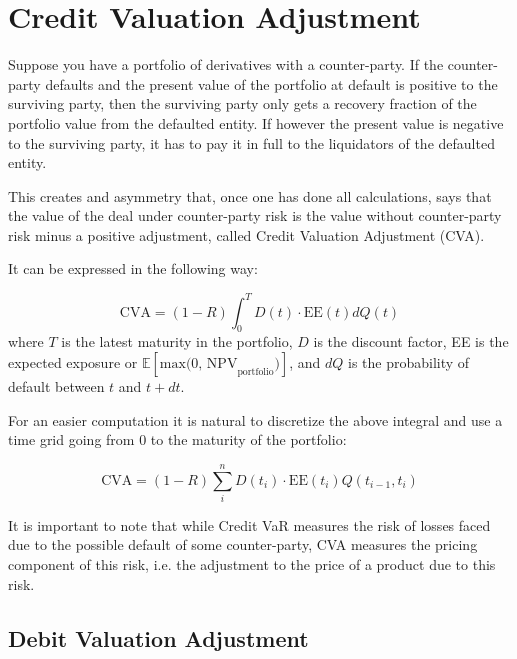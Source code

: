\section{Credit Valuation
Adjustment}\label{credit-valuation-adjustment}

Suppose you have a portfolio of derivatives with a counter-party. 
If the counter-party defaults and the present value of the portfolio at
default is positive to the surviving party, then the surviving party only
gets a recovery fraction of the portfolio value from the defaulted entity. 
If however the present value is negative to the surviving party,
it has to pay it in full to the liquidators of the defaulted entity.

This creates and asymmetry that, once one has done all
calculations, says that the value of the deal under counter-party risk is
the value without counter-party risk minus a positive adjustment, called
Credit Valuation Adjustment (CVA).


It can be expressed in the following way:

\begin{equation}
\text{CVA} = (1-R) \int_0^T D(t) \cdot \textrm{EE}(t) dQ(t)
\label{eq:cva}
\end{equation}
where \(T\) is the latest maturity in the portfolio, \(D\) is the
discount factor, EE is the expected exposure or
\(\mathbb{E}[\text{max(0, NPV}_\text{portfolio})]\), and $dQ$ is the probability of default between $t$ and $t+dt$.

For an easier computation it is natural to discretize the above integral
and use a time grid going from 0 to the maturity of the portfolio:

\begin{equation}
\text{CVA} = (1-R) \sum_i^n D(t_i) \cdot \mathrm{EE}(t_i) Q(t_{i-1}, t_i)
\label{eq:cva_discrete}
\end{equation}

It is important to note that while Credit VaR measures the risk of losses faced due to the possible default of some counter-party, CVA measures the pricing component of this risk, i.e.
the adjustment to the price of a product due to this risk.

\subsection{Debit Valuation Adjustment}

